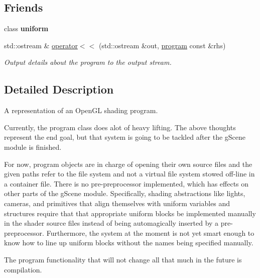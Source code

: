 \subsection*{Friends}
\begin{DoxyCompactItemize}
\item 
\hypertarget{classgfx_1_1program_aaa0316a65d332149b0907898db90f509}{class {\bfseries uniform}}\label{classgfx_1_1program_aaa0316a65d332149b0907898db90f509}

\item 
std\-::ostream \& \hyperlink{classgfx_1_1program_a8ed4f48d5f03defade9c404eeb2c2b0c}{operator$<$$<$} (std\-::ostream \&out, \hyperlink{classgfx_1_1program}{program} const \&rhs)
\begin{DoxyCompactList}\small\item\em Output details about the program to the output stream. \end{DoxyCompactList}\end{DoxyCompactItemize}


\subsection{Detailed Description}
A representation of an Open\-G\-L shading program. 

Currently, the program class does alot of heavy lifting. The above thoughts represent the end goal, but that system is going to be tackled after the g\-Scene module is finished.

For now, program objects are in charge of opening their own source files and the given paths refer to the file system and not a virtual file system stowed off-\/line in a container file. There is no pre-\/preprocessor implemented, which has effects on other parts of the g\-Scene module. Specifically, shading abstractions like lights, cameras, and primitives that align themselves with uniform variables and structures require that that appropriate uniform blocks be implemented manually in the shader source files instead of being automagically inserted by a pre-\/preprocessor. Furthermore, the system at the moment is not yet smart enough to know how to line up uniform blocks without the names being specified manually.

The program functionality that will not change all that much in the future is compilation. 

